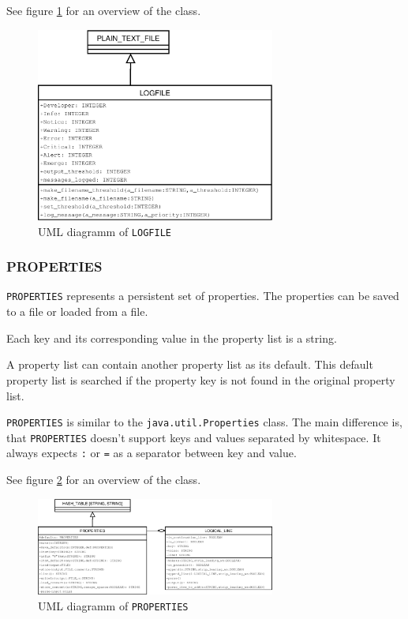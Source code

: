\documentclass[a4paper,fleqn,titlepage]{article}
\begin{document}
See figure \ref{fig:logfile} for an overview of the class.

\begin{figure}[htbp]
  \centering
  \includegraphics[width=0.7\textwidth]{./figures/logfile}
  \caption{UML diagramm of \texttt{LOGFILE}}
  \label{fig:logfile}
\end{figure}


\subsubsection{PROPERTIES}

\texttt{PROPERTIES} represents a persistent set of properties. The
properties can be saved to a file or loaded from a file.

Each key and its corresponding value in the property list is a string.

A property list can contain another property list as its default. This
default property list is searched if the property key is not found in
the original property list.

\texttt{PROPERTIES} is similar to the \texttt{java.util.Properties}
class. The main difference is, that \texttt{PROPERTIES} doesn't
support keys and values separated by whitespace. It always expects
\texttt{:} or \texttt{=} as a separator between key and value.

See figure \ref{fig:properties} for an overview of the class.

\begin{figure}[htbp]
  \centering
  \includegraphics[width=0.7\textwidth]{./figures/properties}
  \caption{UML diagramm of \texttt{PROPERTIES}}
  \label{fig:properties}
\end{figure}
\end{document}
